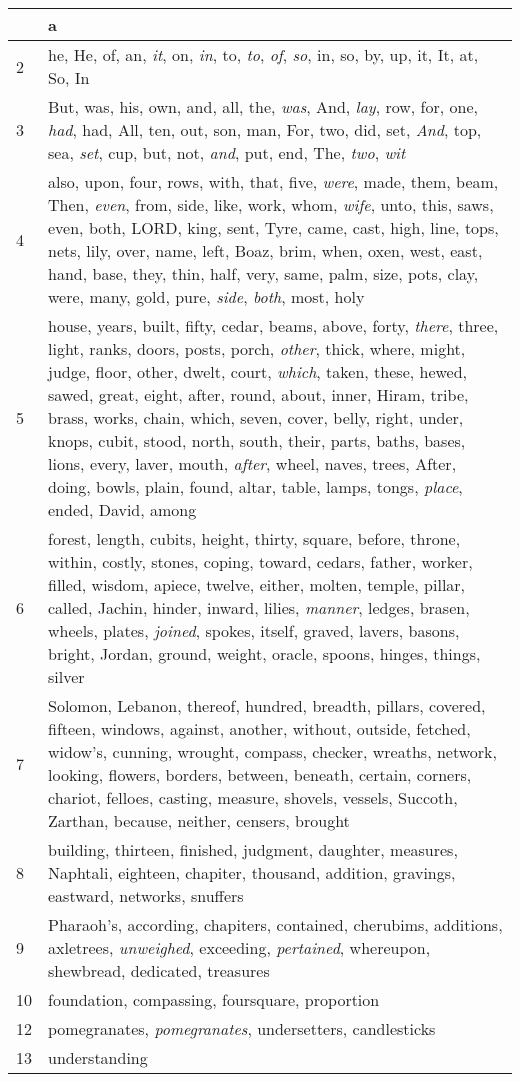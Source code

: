 \begin{longtable}{l|p{3.75in}}
\hline \hline
\endlastfoot
1 & a \\ \hline
2 & he, He, of, an, \emph{it}, on, \emph{in}, to, \emph{to}, \emph{of}, \emph{so}, in, so, by, up, it, It, at, So, In \\ \hline
3 & But, was, his, own, and, all, the, \emph{was}, And, \emph{lay}, row, for, one, \emph{had}, had, All, ten, out, son, man, For, two, did, set, \emph{And}, top, sea, \emph{set}, cup, but, not, \emph{and}, put, end, The, \emph{two}, \emph{wit} \\ \hline
4 & also, upon, four, rows, with, that, five, \emph{were}, made, them, beam, Then, \emph{even}, from, side, like, work, whom, \emph{wife}, unto, this, saws, even, both, LORD, king, sent, Tyre, came, cast, high, line, tops, nets, lily, over, name, left, Boaz, brim, when, oxen, west, east, hand, base, they, thin, half, very, same, palm, size, pots, clay, were, many, gold, pure, \emph{side}, \emph{both}, most, holy \\ \hline
5 & house, years, built, fifty, cedar, beams, above, forty, \emph{there}, three, light, ranks, doors, posts, porch, \emph{other}, thick, where, might, judge, floor, other, dwelt, court, \emph{which}, taken, these, hewed, sawed, great, eight, after, round, about, inner, Hiram, tribe, brass, works, chain, which, seven, cover, belly, right, under, knops, cubit, stood, north, south, their, parts, baths, bases, lions, every, laver, mouth, \emph{after}, wheel, naves, trees, After, doing, bowls, plain, found, altar, table, lamps, tongs, \emph{place}, ended, David, among \\ \hline
6 & forest, length, cubits, height, thirty, square, before, throne, within, costly, stones, coping, toward, cedars, father, worker, filled, wisdom, apiece, twelve, either, molten, temple, pillar, called, Jachin, hinder, inward, lilies, \emph{manner}, ledges, brasen, wheels, plates, \emph{joined}, spokes, itself, graved, lavers, basons, bright, Jordan, ground, weight, oracle, spoons, hinges, things, silver \\ \hline
7 & Solomon, Lebanon, thereof, hundred, breadth, pillars, covered, fifteen, windows, against, another, without, outside, fetched, widow's, cunning, wrought, compass, checker, wreaths, network, looking, flowers, borders, between, beneath, certain, corners, chariot, felloes, casting, measure, shovels, vessels, Succoth, Zarthan, because, neither, censers, brought \\ \hline
8 & building, thirteen, finished, judgment, daughter, measures, Naphtali, eighteen, chapiter, thousand, addition, gravings, eastward, networks, snuffers \\ \hline
9 & Pharaoh's, according, chapiters, contained, cherubims, additions, axletrees, \emph{unweighed}, exceeding, \emph{pertained}, whereupon, shewbread, dedicated, treasures \\ \hline
10 & foundation, compassing, foursquare, proportion \\ \hline
12 & pomegranates, \emph{pomegranates}, undersetters, candlesticks \\ \hline
13 & understanding \\ \hline
\end{longtable}
